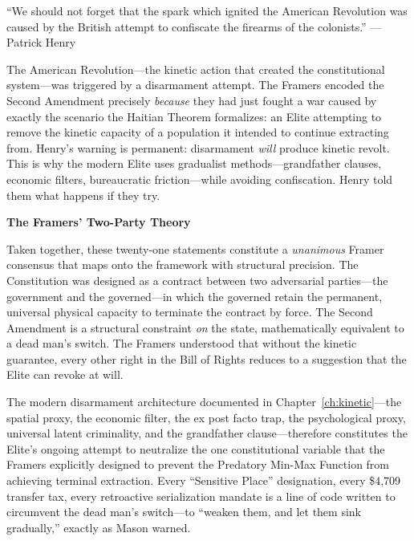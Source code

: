 \begin{historicalsource}
``We should not forget that the spark which ignited the American Revolution was caused by the British attempt to confiscate the firearms of the colonists.'' \hfill ---Patrick Henry
\end{historicalsource}

The American Revolution---the kinetic action that created the constitutional system---was triggered by a disarmament attempt. The Framers encoded the Second Amendment precisely \textit{because} they had just fought a war caused by exactly the scenario the Haitian Theorem formalizes: an Elite attempting to remove the kinetic capacity of a population it intended to continue extracting from. Henry's warning is permanent: disarmament \textit{will} produce kinetic revolt. This is why the modern Elite uses gradualist methods---grandfather clauses, economic filters, bureaucratic friction---while avoiding confiscation. Henry told them what happens if they try.

\medskip
\noindent\textbf{The Framers' Two-Party Theory}

\medskip
Taken together, these twenty-one statements constitute a \textit{unanimous} Framer consensus that maps onto the framework with structural precision. The Constitution was designed as a contract between two adversarial parties---the government and the governed---in which the governed retain the permanent, universal physical capacity to terminate the contract by force. The Second Amendment is a structural constraint \textit{on} the state, mathematically equivalent to a dead man's switch. The Framers understood that without the kinetic guarantee, every other right in the Bill of Rights reduces to a suggestion that the Elite can revoke at will.

The modern disarmament architecture documented in Chapter~\ref{ch:kinetic}---the spatial proxy, the economic filter, the ex post facto trap, the psychological proxy, universal latent criminality, and the grandfather clause---therefore constitutes the Elite's ongoing attempt to neutralize the one constitutional variable that the Framers explicitly designed to prevent the Predatory Min-Max Function from achieving terminal extraction. Every ``Sensitive Place'' designation, every \$4,709 transfer tax, every retroactive serialization mandate is a line of code written to circumvent the dead man's switch---to ``weaken them, and let them sink gradually,'' exactly as Mason warned.


